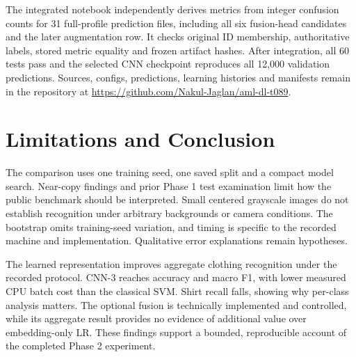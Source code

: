 \documentclass[conference]{IEEEtran}
\begin{document}
The integrated notebook independently derives metrics from integer confusion
counts for 31 full-profile prediction files, including all six fusion-head
candidates and the later augmentation row. It checks original ID membership,
authoritative labels, stored metric equality and frozen artifact hashes.
After integration, all 60 tests pass and the selected CNN checkpoint reproduces
all 12,000 validation predictions. Sources, configs, predictions, learning
histories and manifests remain in the repository at
\url{https://github.com/Nakul-Jaglan/aml-dl-t089}.

\section{Limitations and Conclusion}
The comparison uses one training seed, one saved split and a compact model
search. Near-copy findings and prior Phase 1 test examination limit how the
public benchmark should be interpreted. Small centered grayscale images do
not establish recognition under arbitrary backgrounds or camera conditions.
The bootstrap omits training-seed variation, and timing is specific to the
recorded machine and implementation. Qualitative error explanations remain
hypotheses.

The learned representation improves aggregate clothing recognition under the
recorded protocol. CNN-3 reaches \CnnAccuracy{} accuracy and \CnnFone{} macro F1,
with lower measured CPU batch cost than the classical SVM. Shirt recall falls,
showing why per-class analysis matters. The optional fusion is technically
implemented and controlled, while its aggregate result provides no evidence
of additional value over embedding-only LR. These findings support a bounded,
reproducible account of the completed Phase 2 experiment.



\end{document}
